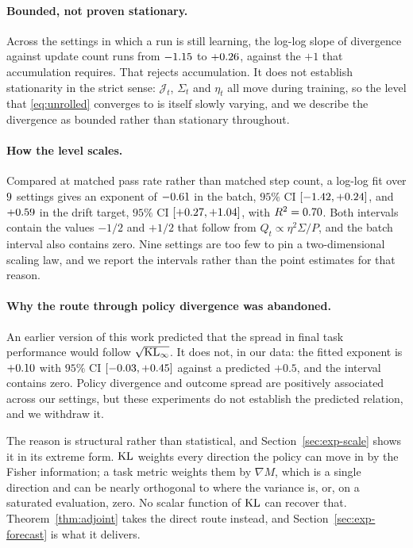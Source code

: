 \paragraph{Bounded, not proven stationary.} Across the settings in which a run is still learning,
the log-log slope of divergence against update count runs from $-1.15$ to $+0.26$, against the
$+1$ that accumulation requires. That rejects accumulation. It does not establish stationarity in
the strict sense: $\mathcal{J}_t$, $\Sigma_t$ and $\eta_t$ all move during training, so the level that
\eqref{eq:unrolled} converges to is itself slowly varying, and we describe the divergence as
bounded rather than stationary throughout.

\paragraph{How the level scales.} Compared at matched pass rate rather than matched step count,
a log-log fit over $9$ settings gives an exponent of $-0.61$ in the
batch, $95\%$ CI $[-1.42, +0.24]$, and $+0.59$ in the drift
target, $95\%$ CI $[+0.27, +1.04]$, with $R^2 = 0.70$.
Both intervals contain the values $-1/2$ and $+1/2$ that follow from
$Q_t \propto \eta^2\Sigma/P$, and the batch interval also contains zero. Nine settings are too few
to pin a two-dimensional scaling law, and we report the intervals rather than the point estimates
for that reason.

\paragraph{Why the route through policy divergence was abandoned.} An earlier version of this work
predicted that the spread in final task performance would follow $\sqrt{\mathrm{KL}_\infty}$. It does not,
in our data: the fitted exponent is $+0.10$ with $95\%$ CI
$[-0.03, +0.45]$ against a predicted
$+0.5$, and the interval contains zero. Policy divergence and outcome spread are positively
associated across our settings, but these experiments do not establish the predicted relation, and
we withdraw it.

The reason is structural rather than statistical, and Section~\ref{sec:exp-scale} shows it in its
extreme form. $\mathrm{KL}$ weights every direction the policy can move in by the Fisher information; a
task metric weights them by $\nabla M$, which is a single direction and can be nearly orthogonal to
where the variance is, or, on a saturated evaluation, zero. No scalar function of $\mathrm{KL}$ can
recover that. Theorem~\ref{thm:adjoint} takes the direct route instead, and
Section~\ref{sec:exp-forecast} is what it delivers.


